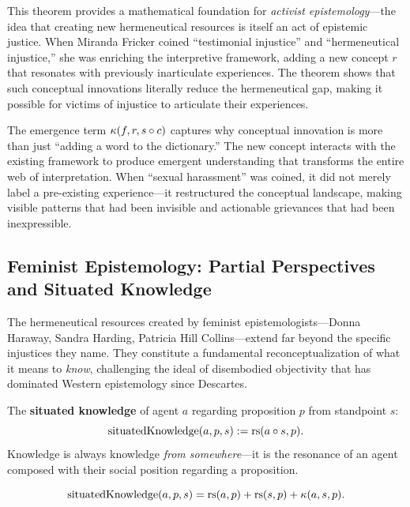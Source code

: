 \begin{interpretation}
This theorem provides a mathematical foundation for \emph{activist epistemology}---the
idea that creating new hermeneutical resources is itself an act of epistemic justice.
When Miranda Fricker coined ``testimonial injustice'' and ``hermeneutical injustice,''
she was enriching the interpretive framework, adding a new concept $r$ that resonates
with previously inarticulate experiences. The theorem shows that such conceptual
innovations literally reduce the hermeneutical gap, making it possible for victims
of injustice to articulate their experiences.

The emergence term $\kappa(f, r, s \circ c)$ captures why conceptual innovation
is more than just ``adding a word to the dictionary.'' The new concept interacts with
the existing framework to produce emergent understanding that transforms the entire
web of interpretation. When ``sexual harassment'' was coined, it did not merely label
a pre-existing experience---it restructured the conceptual landscape, making visible
patterns that had been invisible and actionable grievances that had been inexpressible.
\end{interpretation}

\subsection{Feminist Epistemology: Partial Perspectives and Situated Knowledge}

The hermeneutical resources created by feminist epistemologists---Donna Haraway,
Sandra Harding, Patricia Hill Collins---extend far beyond the specific injustices
they name. They constitute a fundamental reconceptualization of what it means to
\emph{know}, challenging the ideal of disembodied objectivity that has dominated
Western epistemology since Descartes.

\begin{definition}
\label{def:situated-knowledge}
The \textbf{situated knowledge} of agent $a$ regarding proposition $p$ from
standpoint $s$:
\[
  \mathrm{situatedKnowledge}(a, p, s) := \mathrm{rs}(a \circ s, p).
\]
Knowledge is always knowledge \emph{from somewhere}---it is the resonance of an
agent composed with their social position regarding a proposition.
\end{definition}

\begin{theorem}
\label{thm:situated-decomp}
\[
  \mathrm{situatedKnowledge}(a, p, s) = \mathrm{rs}(a, p) + \mathrm{rs}(s, p) + \kappa(a, s, p).
\]
\end{theorem}

